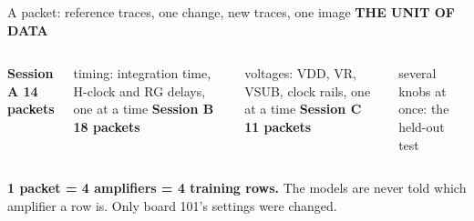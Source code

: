 \documentclass[aspectratio=169,11pt]{beamer}
\newcommand{\eyebrow}[2][trace]{{\color{#1}\scriptsize\bfseries\MakeUppercase{#2}}\par\vspace{0.2em}}
\begin{document}
\begin{frame}{A packet: reference traces, one change, new traces, one image}
\eyebrow{The unit of data}
\begin{center}
\end{center}
\vspace{0.8em}
\begin{columns}[T]
\small\textbf{Session A \textperiodcentered{} 14 packets}\par timing: integration time, H-clock and RG delays, one at a time
\small\textbf{Session B \textperiodcentered{} 18 packets}\par voltages: VDD, VR, VSUB, clock rails, one at a time
\small\textbf{Session C \textperiodcentered{} 11 packets}\par several knobs at once: the held-out test
\end{columns}
\vspace{1em}
\textbf{1 packet = 4 amplifiers = 4 training rows.} The models are never told which amplifier a row is. Only board 101's settings were changed.
\end{frame}
\end{document}
